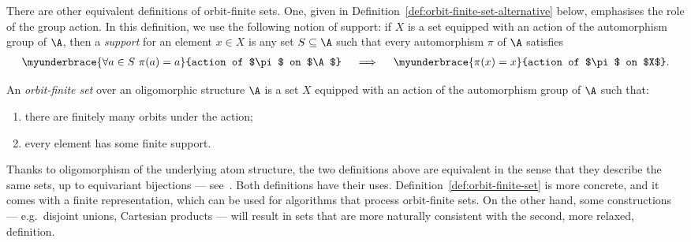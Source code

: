 There are other equivalent definitions of orbit-finite sets. 
One, given in Definition~\ref{def:orbit-finite-set-alternative} below, emphasises the role of the group action. 
In this definition, we use the following notion of support: 
if $X$ is a set equipped with an action of the automorphism group of $\A$, 
then a \emph{support} for an element $x \in X$ is any set $S \subseteq \A$ such that every automorphism $\pi$ of $\A$ satisfies
\begin{align*}
   \myunderbrace{\forall a \in S\ \pi(a)=a}{action of $\pi$ on $\A$}
   \quad \implies \quad 
   \myunderbrace{\pi(x)=x}{action of $\pi$ on $X$}.
\end{align*}
\begin{definition}
    \label{def:orbit-finite-set-alternative} An \emph{orbit-finite set} over an oligomorphic structure $\A$ is a set $X$ equipped with an action of the automorphism group of $\A$ such that: 
   \begin{enumerate}
      \item there are finitely many orbits under the action;
      \item every element has some finite support.
   \end{enumerate}
\end{definition}

Thanks to oligomorphism of the underlying atom structure, the two definitions above are equivalent 
in the sense that they describe the same sets, up to equivariant bijections --- see~\cite[Thm.~5.13]{bojanczyk_slightly}. 
Both definitions have their uses. 
Definition~\ref{def:orbit-finite-set} is more concrete, and it comes with a finite representation, which can be used for algorithms that process orbit-finite sets. 
On the other hand, some constructions --- e.g.~disjoint unions, Cartesian products --- will result in sets that are more naturally consistent with the second, more relaxed, definition. 
